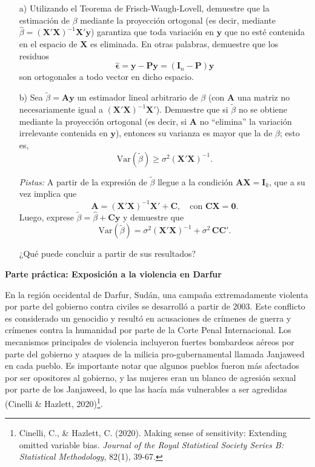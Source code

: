 \documentclass[a4paper, answers, addpoints, 11pt]{exam}
\begin{document}
\begin{enumerate}
\begin{itemize}
    \item[a)] Utilizando el Teorema de Frisch-Waugh-Lovell, demuestre que la estimación de \(\beta\) mediante la proyección ortogonal (es decir, mediante \(\hat{\beta} = (\mathbf{X}'\mathbf{X})^{-1}\mathbf{X}'\mathbf{y}\)) garantiza que toda variación en \(\mathbf{y}\) que no esté contenida en el espacio de \(\mathbf{X}\) es eliminada. En otras palabras, demuestre que los residuos
\[
\hat{\boldsymbol\epsilon} = \mathbf{y} - \mathbf{P}\mathbf{y} = (\mathbf{I}_n - \mathbf{P})\mathbf{y}
\]
son ortogonales a todo vector en dicho espacio.


    \item[b)] Sea \(\tilde{\beta} = \mathbf{A}\mathbf{y}\) un estimador lineal arbitrario de \(\beta\) (con \(\mathbf{A}\) una matriz no necesariamente igual a \((\mathbf{X}'\mathbf{X})^{-1}\mathbf{X}'\)). Demuestre que si \(\tilde{\beta}\) no se obtiene mediante la proyección ortogonal (es decir, si \(\mathbf{A}\) no ``elimina'' la variación irrelevante contenida en \(\mathbf{y}\)), entonces su varianza es mayor que la de \(\hat{\beta}\); esto es,
\[
\mathrm{Var}(\tilde{\beta}) \geq \sigma^2 (\mathbf{X}'\mathbf{X})^{-1}.
\]

\textit{Pistas:} A partir de la expresión de $\tilde{\beta}$ llegue a la condición \(\mathbf{A}\mathbf{X} = \mathbf{I}_k\), que a su vez implica que
\[
\mathbf{A} = (\mathbf{X}'\mathbf{X})^{-1}\mathbf{X}' + \mathbf{C}, \quad \text{con } \mathbf{C}\mathbf{X} = \mathbf{0}.
\]
Luego, exprese \(\tilde{\beta} = \hat{\beta} + \mathbf{C}\mathbf{y}\) y demuestre que
\[
\mathrm{Var}(\tilde{\beta}) = \sigma^2 (\mathbf{X}'\mathbf{X})^{-1} + \sigma^2\,\mathbf{C}\mathbf{C}'.
\] 

¿Qué puede concluir a partir de sus resultados?

\end{itemize}
    \end{enumerate}

    \bigskip

\Large\textbf{Parte práctica: Exposición a la violencia en Darfur}

\normalsize\bigskip En la región occidental de Darfur, Sudán, una campaña extremadamente violenta por parte del gobierno contra civiles se desarrolló a partir de 2003. Este conflicto es considerado un genocidio y resultó en acusaciones de crímenes de guerra y crímenes contra la humanidad por parte de la Corte Penal Internacional. Los mecanismos principales de violencia incluyeron fuertes bombardeos aéreos por parte del gobierno y ataques de la milicia pro-gubernamental llamada Janjaweed en cada pueblo. Es importante notar que algunos pueblos fueron más afectados por ser opositores al gobierno, y las mujeres eran un blanco de agresión sexual por parte de los Janjaweed, lo que las hacía más vulnerables a ser agredidas (Cinelli \& Hazlett, 2020)\footnote{Cinelli, C., \& Hazlett, C. (2020). Making sense of sensitivity: Extending omitted variable bias. \textit{Journal of the Royal Statistical Society Series B: Statistical Methodology}, 82(1), 39-67.
}.
\end{document}
